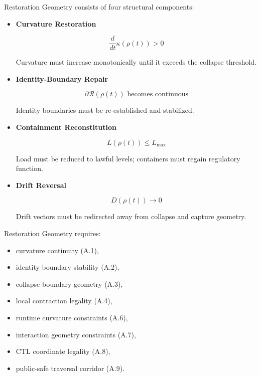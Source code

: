 \medskip

\noindent Restoration Geometry consists of four structural components:

\begin{itemize}
    \item \textbf{Curvature Restoration}  
    

\[
    \frac{d}{dt}\kappa(\rho(t)) > 0
    \]


    Curvature must increase monotonically until it exceeds the collapse
    threshold.

    \item \textbf{Identity-Boundary Repair}  
    

\[
    \partial\mathcal{R}(\rho(t)) \text{ becomes continuous}
    \]


    Identity boundaries must be re-established and stabilized.

    \item \textbf{Containment Reconstitution}  
    

\[
    L(\rho(t)) \le L_{\max}
    \]


    Load must be reduced to lawful levels; containers must regain regulatory
    function.

    \item \textbf{Drift Reversal}  
    

\[
    D(\rho(t)) \rightarrow 0
    \]


    Drift vectors must be redirected away from collapse and capture geometry.
\end{itemize}

\medskip

\noindent Restoration Geometry requires:

\begin{itemize}
    \item curvature continuity (A.1),
    \item identity-boundary stability (A.2),
    \item collapse boundary geometry (A.3),
    \item local contraction legality (A.4),
    \item runtime curvature constraints (A.6),
    \item interaction geometry constraints (A.7),
    \item CTL coordinate legality (A.8),
    \item public-safe traversal corridor (A.9).
\end{itemize}

\medskip

